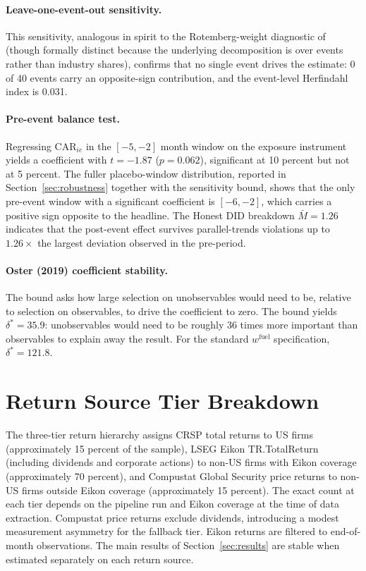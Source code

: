 \documentclass[12pt,a4paper]{article}
\begin{document}
\paragraph{Leave-one-event-out sensitivity.}
This sensitivity, analogous in spirit to the Rotemberg-weight diagnostic of \citet{GoldsmithPinkhamSorkinSwift2020} (though formally distinct because the underlying decomposition is over events rather than industry shares), confirms that no single event drives the estimate: 0 of 40 events carry an opposite-sign contribution, and the event-level Herfindahl index is 0.031.

\paragraph{Pre-event balance test.}
Regressing $\text{CAR}_{ie}$ in the $[-5, -2]$ month window on the exposure instrument yields a coefficient with $t = -1.87$ ($p = 0.062$), significant at 10 percent but not at 5 percent. The fuller placebo-window distribution, reported in Section~\ref{sec:robustness} together with the \citet{RambachanRoth2023} sensitivity bound, shows that the only pre-event window with a significant coefficient is $[-6, -2]$, which carries a positive sign opposite to the headline. The Honest DID breakdown $\bar{M} = 1.26$ indicates that the post-event effect survives parallel-trends violations up to $1.26\times$ the largest deviation observed in the pre-period.

\paragraph{Oster (2019) coefficient stability.}
The bound asks how large selection on unobservables would need to be, relative to selection on observables, to drive the coefficient to zero. The bound yields $\delta^* = 35.9$: unobservables would need to be roughly 36 times more important than observables to explain away the result. For the standard $w^{\text{fuel}}$ specification, $\delta^* = 121.8$.


\section{Return Source Tier Breakdown}\label{app:return_sources}

The three-tier return hierarchy assigns CRSP total returns to US firms (approximately 15 percent of the sample), LSEG Eikon TR.TotalReturn (including dividends and corporate actions) to non-US firms with Eikon coverage (approximately 70 percent), and Compustat Global Security price returns to non-US firms outside Eikon coverage (approximately 15 percent). The exact count at each tier depends on the pipeline run and Eikon coverage at the time of data extraction. Compustat price returns exclude dividends, introducing a modest measurement asymmetry for the fallback tier. Eikon returns are filtered to end-of-month observations. The main results of Section~\ref{sec:results} are stable when estimated separately on each return source.
\end{document}
